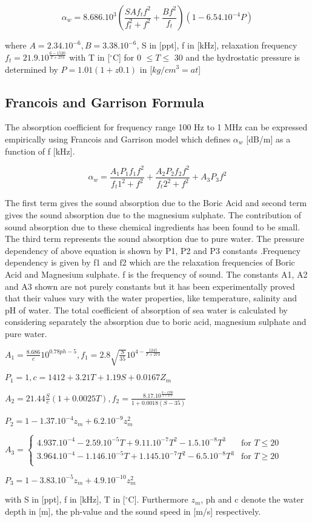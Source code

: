 \[ \alpha_w  = 8.686.10^3 (\frac{S A f_t  f^2}{f_t ^2 + f^2} + \frac{B f^2}{f_t})(1 - 6.54.10^{-4} P) \] 

\noindent where  \(A = 2.34.10^{-6}, B = 3.38.10^{-6}\), S in [ppt], f in [kHz], relaxation frequency \(f_t = 21.9.10^\frac{6-1520}{T+273}\) with T in [$^{\circ}$C] for 0 $\leq T \leq$ 30 and the hydrostatic pressure is determined by \( P = 1.01 (1 + z 0.1)\) in [$kg/cm^3 = at$]

\subsection{ Francois and Garrison Formula } \label{ Francois and Garrison Formula }

\noindent  The absorption coefficient for frequency range 100 Hz to 1 MHz can be expressed empirically using Francois and Garrison model which defines  $\alpha_w$ [dB/m] as a function of f [kHz].

\[ \alpha_w  = \frac{ A _1 P_1 f_1 f^2}{f_t1^2 + f^2} + \frac{ A _2 P_2 f_2 f^2}{f_t2^2 + f^2}  + A_3 P_3 f^2 \] 

\noindent The first term gives the sound absorption due to the Boric Acid and second term gives the sound absorption due to the magnesium sulphate. The contribution of sound absorption due to these chemical ingredients has been found to be small. The third term represents the sound absorption due to pure water. The pressure dependency of above equation is shown by P1, P2 and P3 constants .Frequency dependency is given by f1 and f2 which are the relaxation frequencies of Boric Acid and Magnesium sulphate. f is the frequency of sound. The constants A1, A2 and A3 shown are not purely constants but it has been experimentally proved that their values vary with the water properties, like temperature, salinity and pH of water. The total coefficient of absorption of sea water is calculated by considering separately the absorption due to boric acid, magnesium sulphate and pure water. 

\noindent \(A_1 = \frac{8.686}{c} 10^{0.78 ph - 5}, f_1 = 2.8 \sqrt{\frac{S}{35}}10^{4 - \frac{1245}{T+273}}\)

\noindent \( P_1 = 1, c = 1412 +3.21 T + 1.19 S + 0.0167 Z_m\)

\noindent \(A_2 = 21.44\frac{S}{c}(1 + 0.0025 T),  f_2 = \frac{8.17.10^{\frac{8-1990}{T+273}}}{1+0.0018(S-35)}\)

\noindent \( P_2 = 1 - 1.37.10^{-4} z_m + 6.2.10^{-9} z_m^2 \)

\noindent \(A_3 =
\begin{cases}
  4.937.10^{-4} - 2.59.10^{-5} T + 9.11.10^{-7} T^2 - 1.5.10^{-8} T^3 & \text{for $T \leq 20$ }\\    
 3.964.10^{-4} - 1.146.10^{-5} T + 1.145.10^{-7} T^2 - 6.5.10^{-8} T^3 & \text{for $T \geq 20$ }\\  
\end{cases}
\)

\noindent \( P_3 = 1 - 3.83.10^{-5} z_m + 4.9.10^{-10} z_m^2 \)

\noindent with S in [ppt], f in [kHz], T in [$^{\circ}$C]. Furthermore $z_m$, ph and c denote the water depth in [m], the ph-value and the sound speed in [m/s] respectively.
